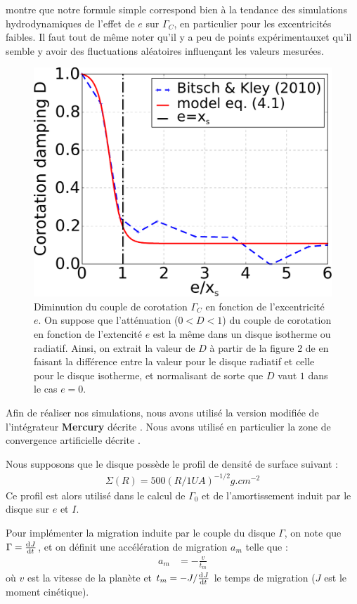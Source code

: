  montre que notre formule simple  correspond bien à la tendance des simulations hydrodynamiques de l'effet de $e$ sur $\Gamma_C$, en particulier pour les excentricités faibles. Il faut tout de même noter qu'il y a peu de points \og expérimentaux\fg et qu'il semble y avoir des fluctuations aléatoires influençant les valeurs mesurées.

\begin{figure}[htbp]
\centering
\includegraphics[width=0.49\linewidth]{figure/shifted/corotation_damping_profile.pdf}
\caption[Amortissement du couple de corotation en fonction de l'excentricité de la planète.]{Diminution du couple de corotation
$\Gamma_C$ en fonction de l'excentricité $e$. On suppose que l'atténuation ($0<D<1$) du couple de corotation en fonction de
l'extencité $e$ est la même dans un disque isotherme ou radiatif. Ainsi, on extrait la valeur de $D$ à partir de la figure 2 de
\cite{bitsch2010orbital} en faisant la différence entre la valeur pour le disque radiatif et celle pour le disque isotherme, et
normalisant de sorte que $D$ vaut $1$ dans le cas $e=0$.}\label{fig:shifted_CZ_D_profile}
\end{figure}

\bigskip

Afin de réaliser nos simulations, nous avons utilisé la version modifiée de l'intégrateur \textbf{Mercury}\citep{chambers1999hybrid} décrite . Nous avons utilisé en particulier la zone de convergence artificielle décrite . 

Nous supposons que le disque possède le profil de densité de surface suivant :
\begin{align}
\Sigma(R) = 500 \left(R/1\unit{UA}\right)^{-1/2} \unit{g.cm^{-2}}
\end{align}
Ce profil est alors utilisé dans le calcul de $\Gamma_0$ et de l'amortissement induit par le disque sur $e$ et $I$.

Pour implémenter la migration induite par le couple du disque $\Gamma$, on note que $\Gamma=\od{J}{t}$, et on définit une accélération de migration $a_m$ telle que\citep[eq. (14)]{cresswell2008three} :
\begin{align}
a_m &= - \frac{v}{t_m}
\end{align}
où $v$ est la vitesse de la planète et $t_m=-J/\od{J}{t}$ le temps de migration ($J$ est le moment cinétique).

